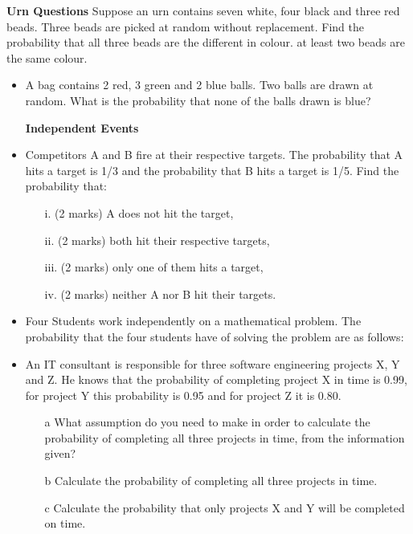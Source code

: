 \documentclass[12pt]{report}
\begin{document}
\bigskip 
\textbf{Urn Questions}
Suppose an urn contains seven white, four black and three red beads. Three beads are picked at random without replacement.
Find the probability that all three beads are the different in colour.
at least two beads are the same colour.
\begin{itemize}	
	\item A bag contains 2 red, 3 green and 2 blue balls. Two balls are drawn at random. What is the probability that none of the balls drawn is blue?
	
	
	
	\bigskip 
	\textbf{Independent Events}
	\item Competitors A and B fire at their respective targets. The probability that A hits a target is 1/3 and the probability that B hits a target is 1/5. Find the probability that:
	\begin{itemize}
		\item[i.] (2 marks) A does not hit the target,
		\item[ii.](2 marks)  both hit their respective targets,
		\item[iii.](2 marks)  only one of them hits a target,
		\item[iv.](2 marks) neither A nor B hit their targets.
	\end{itemize}
	
	\item Four Students work independently on a mathematical problem. The probability that the four students have of solving the problem are as follows:
	\item An IT consultant is responsible for three software engineering projects X, Y and Z.
	He knows that the probability of completing project X in time is 0.99, for project Y this probability is 0.95
	and for project Z it is 0.80.
	
	\begin{itemize}
		\item[a] What assumption do you need to make in order to calculate the probability
		of completing all three projects in time, from the information given?
		\item[b] Calculate the probability of completing all three projects in time.
		\item[c] Calculate the probability that only projects X and Y will be completed on time.
	\end{itemize}
	

\end{itemize}
\end{document}
